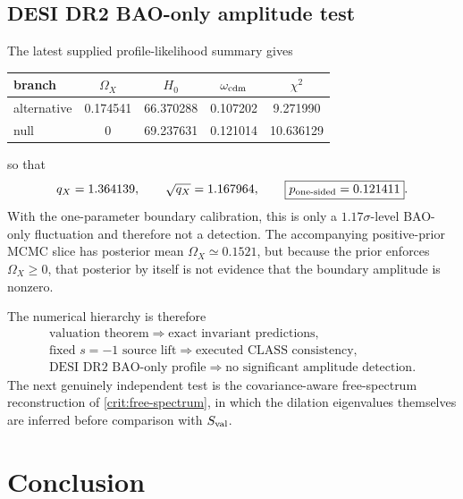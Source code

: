 \documentclass[aps,prd,reprint,onecolumn,nofootinbib,superscriptaddress,showkeys]{revtex4-2}
\numberwithin{equation}{section}
\theoremstyle{definition}
\theoremstyle{plain}
\begin{document}
\subsection{DESI DR2 BAO-only amplitude test}

The latest supplied profile-likelihood summary gives
\begin{center}
\begin{tabular}{@{}lcccc@{}}
\toprule
branch & \(\Omega_X\) & \(H_0\) & \(\omega_{\rm cdm}\) & \(\chi^2\) \\
\midrule
alternative & 0.174541 & 66.370288 & 0.107202 & 9.271990 \\
null & 0 & 69.237631 & 0.121014 & 10.636129 \\
\bottomrule
\end{tabular}
\end{center}
so that
\begin{equation}
q_X=1.364139,
\qquad
\sqrt{q_X}=1.167964,
\qquad
\boxed{p_{\rm one\text{-}sided}=0.121411}.
\end{equation}
With the one-parameter boundary calibration, this is only a \(1.17\sigma\)-level BAO-only fluctuation and therefore not a detection.  The accompanying positive-prior MCMC slice has posterior mean \(\Omega_X\simeq0.1521\), but because the prior enforces \(\Omega_X\ge0\), that posterior by itself is not evidence that the boundary amplitude is nonzero.

The numerical hierarchy is therefore
\begin{equation}
\boxed{
\begin{gathered}
\text{valuation theorem}\Longrightarrow\text{exact invariant predictions},\\
\text{fixed }s=-1\text{ source lift}\Longrightarrow\text{executed CLASS consistency},\\
\text{DESI DR2 BAO-only profile}\Longrightarrow\text{no significant amplitude detection}.
\end{gathered}}
\end{equation}
The next genuinely independent test is the covariance-aware free-spectrum reconstruction of \cref{crit:free-spectrum}, in which the dilation eigenvalues themselves are inferred before comparison with \(S_{\rm val}\).


\section{Conclusion}
\end{document}
